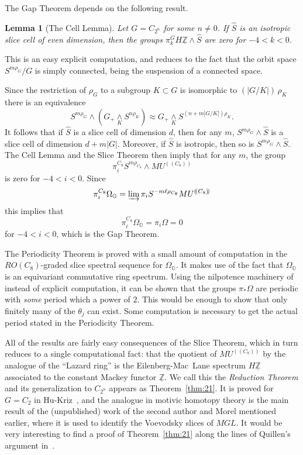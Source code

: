 \documentclass{amsart}
\newtheorem{lem}[equation]{Lemma}
\theoremstyle{definition}
\theoremstyle{remark}
\newcommand{\Z}{{\mathbb Z}}
\newcommand{\mutn}[1]{MU^{(\!(#1)\!)}}
\newcommand{\smashove}[1]{\underset{#1}{\wedge}}
\newcommand{\Zm}{\underline{\Z}}
\newcommand{\zt}{C_{2}}
\newcommand{\ze}{C_{8}}
\newcommand{\ztn}{C_{2^{n}}}
\newcommand{\slicecell}{\widehat{S}}
\newcommand{\magic}{\Omega}
\newcommand{\premagic}{\Omega_{\mathbb{O}}}
\begin{document}
The Gap Theorem depends on the following result.

\begin{lem}[The Cell Lemma] Let $G=\ztn$ for some $n\ne 0$.  If
$\slicecell$ is an isotropic slice cell of even dimension, then the
groups $\pi_{k}^{G}H\Zm\wedge \slicecell$ are zero for $-4<k<0$.
\end{lem}

This is an easy explicit computation, and reduces to the fact that the
orbit space $S^{m\rho_{G}}/G$ is simply connected, being the
suspension of a connected space. 

Since the restriction of $\rho_{G}$ to a subgroup $K\subset G$ is
isomorphic to $(|G/K|)\,\rho_{K}$ there is an equivalence
\[
S^{m\rho_{G}}\wedge (G_{+}\smashove{K} S^{n\rho_{K}})\approx
G_{+}\smashove{K} S^{(n+m|G/K|)\rho_{K}}.
\]
It follows that if $\slicecell$ is a slice cell of dimension $d$, then
for any $m$, $S^{m\rho_{G}}\wedge \slicecell$ is a slice cell of
dimension $d+m|G|$.  Moreover, if $\slicecell$ is isotropic, then so
is $S^{m\rho_{G}}\wedge \slicecell$.  The Cell Lemma and the Slice
Theorem then imply that for any $m$, the group
\[
\pi^{\ze}_{i}S^{m\rho_{\ze}}\wedge\mutn{\ze}
\]
is zero for $-4<i<0$.   Since
\[
\pi^{\ze}_{i}\premagic = \varinjlim \pi_{i}S^{-m\ell\rho_{\ze}} \mutn{\ze}
\]
this implies that
\[
\pi^{\ze}_{i}\premagic=\pi_{i}\magic = 0
\]
for $-4<i<0$, which is the Gap Theorem.

The Periodicity Theorem is proved with a small amount of computation
in the $RO(\ze)$-graded slice spectral sequence for $\premagic$.  It
makes use of the fact that $\premagic$ is an equivariant commutative
ring spectrum.  Using the nilpotence machinery of~\cite{DHS,HS}
instead of explicit computation, it can be shown that the groups
$\pi_{\ast}\magic$ are periodic with {\em some} period which a power
of $2$.  This would be enough to show that only finitely many of the
$\theta_{j}$ can exist.  Some computation is necessary to get the
actual period stated in the Periodicity Theorem.

All of the results are fairly easy consequences of the Slice Theorem,
which in turn reduces to a single computational fact: that the
quotient of $\mutn{\ze}$ by the analogue of the ``Lazard ring'' is the
Eilenberg-Mac~Lane spectrum $H\Zm$ associated to the constant Mackey
functor $\Zm$.  We call this the {\em Reduction Theorem} and its
generalization to $\ztn$ appears as Theorem~\ref{thm:21}.  It is
proved for $G=\zt$ in Hu-Kriz~\cite{MR1808224}, and the analogue in
motivic homotopy theory is the main result of the (unpublished) work
of the second author and Morel mentioned earlier, where it is used to
identify the Voevodsky slices of $MGL$.  It would be very interesting
to find a proof of Theorem~\ref{thm:21} along the lines of Quillen's
argument in~\cite{MR0290382}.
\end{document}
